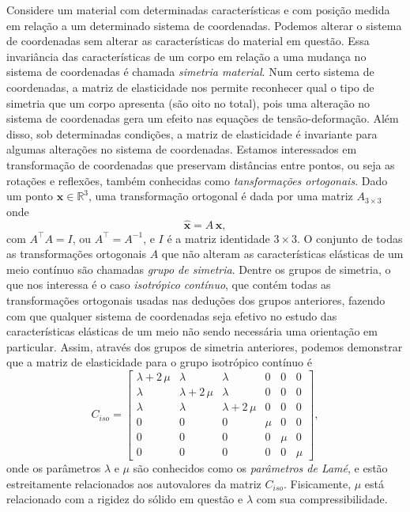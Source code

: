 Considere um material com determinadas caracter\'isticas e com posi\c{c}\~ao medida em rela\c{c}\~ao a um determinado sistema de coordenadas. Podemos alterar o sistema de coordenadas sem alterar as caracter\'isticas do material em quest\~ao. Essa invari\^ancia das caracter\'isticas de um corpo em rela\c{c}\~ao a uma mudan\c{c}a no sistema de coordenadas \'e chamada \textit{simetria material}. Num certo sistema de coordenadas, a matriz de elasticidade nos permite reconhecer qual o tipo de simetria que um corpo apresenta (s\~ao oito no total), pois uma altera\c{c}\~ao no sistema de coordenadas gera um efeito nas equa\c{c}\~oes de tens\~ao-deforma\c{c}\~ao.  Além disso, sob determinadas condi\c{c}\~oes, a matriz de elasticidade \'e invariante para algumas altera\c{c}\~oes no sistema de coordenadas.
Estamos interessados em transforma\c{c}\~ao de coordenadas que preservam dist\^ancias entre pontos, ou seja as rota\c{c}\~oes e reflex\~oes, tamb\'em conhecidas como \textit{tansforma\c{c}\~oes ortogonais}. Dado um ponto $\mathbf{x}\in\mathbb{R}^3$, uma transforma\c{c}\~ao ortogonal \'e dada por uma matriz $A_{3\times 3}$ onde 
\begin{equation*}
\mathbf{\hat{x}}=A\,\mathbf{x},
\end{equation*} 
com $A^\top A=I$, ou $A^\top=A^{-1}$, e $I$ \'e a matriz identidade $3\times 3$.
O conjunto de todas as transforma\c{c}\~oes ortogonais $A$ que n\~ao alteram as caracter\'isticas el\'asticas de um meio cont\'inuo s\~ao chamadas \textit{grupo de simetria}. Dentre os grupos de simetria, o que nos interessa \'e o caso \textit{isotr\'opico cont\'inuo}, que cont\'em todas as transforma\c{c}\~oes ortogonais usadas nas deduções dos grupos anteriores, fazendo com que qualquer sistema de coordenadas seja efetivo no estudo das caracter\'isticas el\'asticas de um meio n\~ao sendo necess\'aria uma orienta\c{c}\~ao em particular. Assim, atrav\'es dos grupos de simetria anteriores, podemos demonstrar que a matriz de elasticidade para o grupo isotr\'opico cont\'inuo \'e
\begin{equation}
C_{iso}=
\begin{bmatrix}
\lambda +2\,\mu & \lambda & \lambda &0&0&0\\
\lambda&\lambda+2\,\mu&\lambda&0&0&0\\
\lambda&\lambda&\lambda+2\,\mu&0&0&0\\
0&0&0&\mu&0&0\\
0&0&0&0&\mu&0\\
0&0&0&0&0&\mu
\end{bmatrix},
\end{equation} 
onde os par\^ametros $\lambda$ e $\mu$ s\~ao conhecidos como os \textit{par\^ametros de Lam\'e}, e est\~ao estreitamente relacionados aos autovalores da matriz $C_{iso}$. Fisicamente, $\mu$ est\'a relacionado com a rigidez do s\'olido em quest\~ao e $\lambda$ com sua compressibilidade.

